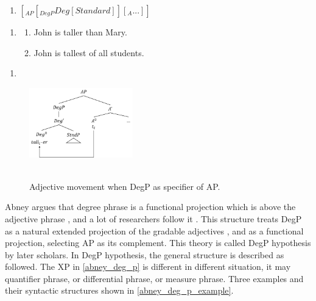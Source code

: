 \documentclass{ctexart}
\let \cite \parencite
\begin{document}
\begin{enumerate}
    \item \label{old_deg_structure} $[_{AP}[_{DegP}Deg[Standard]][_{A}...]]$
\end{enumerate}

\begin{enumerate}
    \item \label{old_deg_structure_example}
    \begin{enumerate}
        \item John is taller than Mary.
        \item John is tallest of all students.
    \end{enumerate}
\end{enumerate}

\begin{enumerate}
    \item \label{traditional_move}
\end{enumerate}

\begin{figure}[H]
    \centering
    \includegraphics[width=0.4\textwidth]{pic/traditional_move.png}
    \begin{caption}
        \\ \vspace{-1.1ex}
        Adjective movement when DegP as specifier of AP.
    \end{caption}
\end{figure}

Abney argues that degree phrase is a functional projection which is above the adjective phrase \cite{abney1987}, and a lot of researchers follow it \cite{corver1993,zwarts1992}. This structure treats DegP as a natural extended projection of the gradable adjectives \cite{grimshaw2005}, and as a functional projection, selecting AP as its complement. This theory is called DegP hypothesis by later scholars. In DegP hypothesis, the general structure is described as followed. The XP in \ref{abney_deg_p} is different in different situation, it may quantifier phrase, or differential phrase, or measure phrase. Three examples and their syntactic structures shown in \ref{abney_deg_p_example}.
\end{document}
